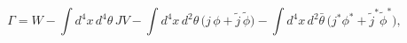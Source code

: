 \begin{equation}\label{Gamma}
\Gamma = W - \int d^4x\,d^4\theta\,J V
- \int d^4x\,d^2\theta\, \Big(j\,\phi + \tilde j\,\tilde\phi \Big)
- \int d^4x\,d^2\bar\theta\,
\Big(j^*\phi^* + \tilde j^* \tilde\phi^* \Big),
\end{equation}

